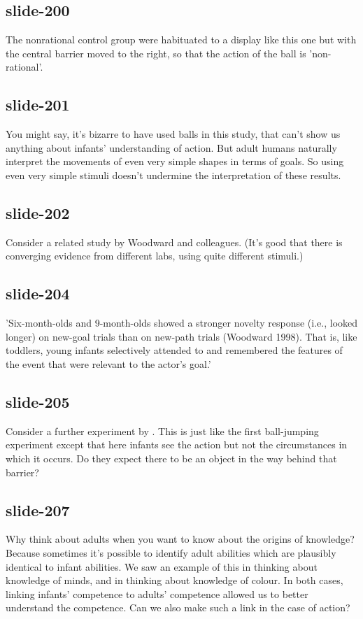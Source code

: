 \documentclass[12pt,\papersize]{extarticle}
\begin{document}
 
\subsection{slide-200}
The nonrational control group were habituated to a display like this one but with the central barrier moved to the right, so that the action of the ball is 'non-rational'.
 
 
\subsection{slide-201}
You might say, it's bizarre to have used balls in this study, that can't show us anything about infants' understanding of action.
But adult humans naturally interpret the movements of even very simple shapes in terms of goals.
So using even very simple stimuli doesn't undermine the interpretation of these results.
 
 
\subsection{slide-202}
Consider a related study by Woodward and colleagues.
(It's good that there is converging evidence from different labs, using quite different stimuli.)
 
 
\subsection{slide-204}
'Six-month-olds and 9-month-olds showed a stronger novelty response (i.e., looked longer) on new-goal trials than on new-path trials (Woodward 1998). That is, like toddlers, young infants selectively attended to and remembered the features of the event that were relevant to the actor’s goal.'
\citep[p.\ 153]{woodward:2001_making}
 
 
\subsection{slide-205}
Consider a further experiment by \citet{Csibra:2003jv}.
This is just like the first ball-jumping experiment except that here infants see the action but not the circumstances in which it occurs.
Do they expect there to be an object in the way behind that barrier?
 
 
\subsection{slide-207}
Why think about adults when you want to know about the origins of knowledge?
Because sometimes it's possible to identify adult abilities which are plausibly identical to infant abilities.
We saw an example of this in thinking about knowledge of minds, and in thinking about knowledge of colour.
In both cases, linking infants' competence to adults' competence allowed us to better understand the competence.
Can we also make such a link in the case of action?
 
\end{document}
